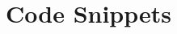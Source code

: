 \chapter{Code Snippets}\label{app-code}

\mainInvalidInputTest{}

\projViolationChoice{}

\projManualViolationReq{}

\exampleCode{}

\examplePseudocode{}
